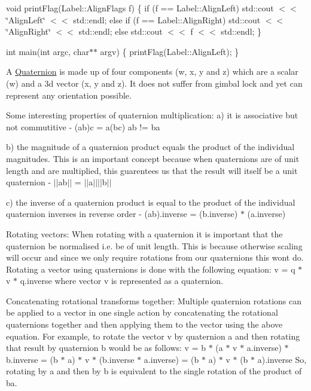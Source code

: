 void print\+Flag(\+Label\+::\+Align\+Flags f) \{ if (f == Label\+::\+Align\+Left) std\+::cout $<$$<$ \char`\"{}\+Align\+Left\char`\"{} $<$$<$ std\+::endl; else if (f == Label\+::\+Align\+Right) std\+::cout $<$$<$ \char`\"{}\+Align\+Right\char`\"{} $<$$<$ std\+::endl; else std\+::cout $<$$<$ f $<$$<$ std\+::endl; \}

int main(int argc, char$\ast$$\ast$ argv) \{ print\+Flag(\+Label\+::\+Align\+Left); \}

A \hyperlink{classprism_1_1_quaternion}{Quaternion} is made up of four components (w, x, y and z) which are a scalar (w) and a 3d vector (x, y and z). It does not suffer from gimbal lock and yet can represent any orientation possible.

Some interesting properties of quaternion multiplication\+: a) it is associative but not commutitive -\/ (ab)c = a(bc) ab != ba

b) the magnitude of a quaternion product equals the product of the individual magnitudes. This is an important concept because when quaternions are of unit length and are multiplied, this guarentees us that the result will itself be a unit quaternion -\/ $\vert$$\vert$ab$\vert$$\vert$ = $\vert$$\vert$a$\vert$$\vert$$\vert$$\vert$b$\vert$$\vert$

c) the inverse of a quaternion product is equal to the product of the individual quaternion inverses in reverse order -\/ (ab).inverse = (b.\+inverse) $\ast$ (a.\+inverse)

Rotating vectors\+: When rotating with a quaternion it is important that the quaternion be normalised i.\+e. be of unit length. This is because otherwise scaling will occur and since we only require rotations from our quaternions this won\textquotesingle{}t do. Rotating a vector using quaternions is done with the following equation\+: v\textquotesingle{} = q $\ast$ v $\ast$ q.\+inverse where vector v is represented as a quaternion.

Concatenating rotational transforms together\+: Multiple quaternion rotations can be applied to a vector in one single action by concatenating the rotational quaternions together and then applying them to the vector using the above equation. For example, to rotate the vector v by quaternion a and then rotating that result by quaternion b would be as follows\+: v\textquotesingle{} = b $\ast$ (a $\ast$ v $\ast$ a.\+inverse) $\ast$ b.\+inverse = (b $\ast$ a) $\ast$ v $\ast$ (b.\+inverse $\ast$ a.\+inverse) = (b $\ast$ a) $\ast$ v $\ast$ (b $\ast$ a).inverse So, rotating by a and then by b is equivalent to the single rotation of the product of ba. 

